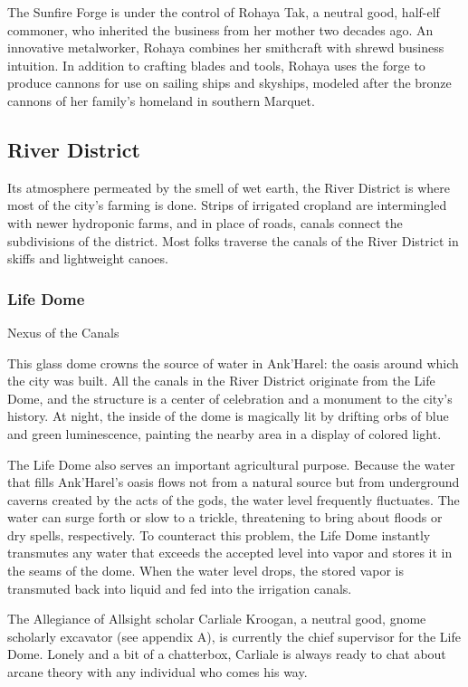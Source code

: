 \documentclass[10pt,a4paper,twoside,bg=print,twocolumn,openany,nodeprecatedcode]{dndbook}
\begin{document}
The Sunfire Forge is under the control of Rohaya Tak, a neutral good, half-elf commoner, who inherited the business from her mother two decades ago. An innovative metalworker, Rohaya combines her smithcraft with shrewd business intuition. In addition to crafting blades and tools, Rohaya uses the forge to produce cannons for use on sailing ships and skyships, modeled after the bronze cannons of her family's homeland in southern Marquet.

\subsection{River District}
Its atmosphere permeated by the smell of wet earth, the River District is where most of the city's farming is done. Strips of irrigated cropland are intermingled with newer hydroponic farms, and in place of roads, canals connect the subdivisions of the district. Most folks traverse the canals of the River District in skiffs and lightweight canoes.

\subsubsection{Life Dome}
Nexus of the Canals

This glass dome crowns the source of water in Ank'Harel: the oasis around which the city was built. All the canals in the River District originate from the Life Dome, and the structure is a center of celebration and a monument to the city's history. At night, the inside of the dome is magically lit by drifting orbs of blue and green luminescence, painting the nearby area in a display of colored light.

The Life Dome also serves an important agricultural purpose. Because the water that fills Ank'Harel's oasis flows not from a natural source but from underground caverns created by the acts of the gods, the water level frequently fluctuates. The water can surge forth or slow to a trickle, threatening to bring about floods or dry spells, respectively. To counteract this problem, the Life Dome instantly transmutes any water that exceeds the accepted level into vapor and stores it in the seams of the dome. When the water level drops, the stored vapor is transmuted back into liquid and fed into the irrigation canals.

The Allegiance of Allsight scholar Carliale Kroogan, a neutral good, gnome scholarly excavator (see appendix A), is currently the chief supervisor for the Life Dome. Lonely and a bit of a chatterbox, Carliale is always ready to chat about arcane theory with any individual who comes his way.
\end{document}
